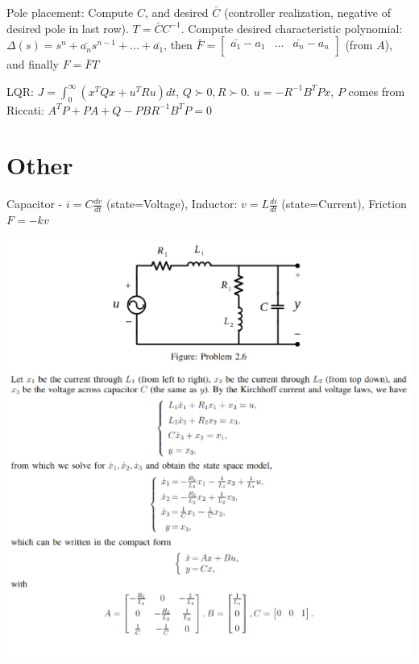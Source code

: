 \documentclass[11pt]{article}
\begin{document}
Pole placement: Compute $C$, and desired $\bar{C}$ (controller realization, negative of desired pole in last row).
$T = \bar{C}C^{-1}$. Compute desired characteristic polynomial: $\Delta(s) = s^n + \bar{a_n}s^{n-1} + \dots + \bar{a_1}$,
then $\bar{F} = \begin{bmatrix}
    \bar{a_1} - a_1 & \dots & \bar{a_n} - a_n \\
\end{bmatrix}$ (from $A$), and finally $F = \bar{F}T$

LQR: $J = \int_0^\infty (x^T Q x + u^T R u) dt$, $Q \succ 0, R \succ 0$. $u = -R^{-1}B^T Px$, $P$ comes from Riccati: $A^T P + PA + Q - PBR^{-1}B^TP = 0$
\section{Other}

Capacitor - $i = C \frac{dv}{dt}$ (state=Voltage), Inductor: $v = L \frac{di}{dt}$ (state=Current), Friction $F = -k v$

\begin{center}
    \includegraphics[width=0.99 \linewidth]{10-09-p1.png}
\end{center}
\end{document}
